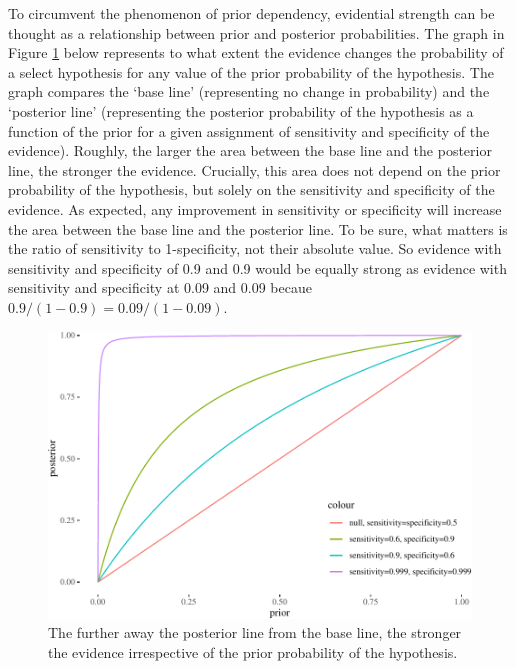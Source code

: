 \documentclass[10pt,dvipsnames,enabledeprecatedfontcommands]{scrartcl}
\begin{document}
To circumvent the phenomenon of prior dependency, evidential strength
can be thought as a relationship between prior and posterior
probabilities. The graph in Figure \ref{fig:strength-prior-post} below
represents to what extent the evidence changes the probability of a
select hypothesis for any value of the prior probability of the
hypothesis. The graph compares the `base line' (representing no change
in probability) and the `posterior line' (representing the posterior
probability of the hypothesis as a function of the prior for a given
assignment of sensitivity and specificity of the evidence). Roughly, the
larger the area between the base line and the posterior line, the
stronger the evidence. Crucially, this area does not depend on the prior
probability of the hypothesis, but solely on the sensitivity and
specificity of the evidence. As expected, any improvement in sensitivity
or specificity will increase the area between the base line and the
posterior line. To be sure, what matters is the ratio of sensitivity to
1-specificity, not their absolute value. So evidence with sensitivity
and specificity of 0.9 and 0.9 would be equally strong as evidence with
sensitivity and specificity at 0.09 and 0.09 becaue
\(0.9/(1-0.9) = 0.09/(1-0.09)\).

\begin{figure}


\begin{center}\includegraphics[width=0.9\linewidth]{conjunction-paradox_files/figure-latex/unnamed-chunk-12-1} \end{center}

\caption{The further away the posterior line from the base 
line, the stronger the evidence irrespective 
of the prior probability of the hypothesis.}
\label{fig:strength-prior-post}
\end{figure}
\end{document}
